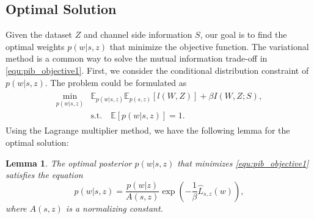 \documentclass[lettersize,journal]{IEEEtran}
\newcommand{\E}{\mathbb{E}}
\theoremstyle{definition}
\theoremstyle{plain}
\newtheorem{lemma}{Lemma}
\begin{document}
\subsection{Optimal Solution}
Given the dataset $Z$ and channel side information $S$, our goal is to find the optimal weights $p(w|s,z)$ that minimize the objective function. The variational method is a common way to solve the mutual information trade-off in \cref{equ:pib_objective1}. First, we consider the conditional distribution constraint of $p(w|s,z)$. The problem could be formulated as
\begin{align}
    \begin{split}
        \min_{p(w|s,z)} & \E_{p(w|s,z)} \E_{p(s,z)}\left[l(W,Z)\right] + \beta I(W,Z;S),\\
        & \text{s.t.}\quad \E \left[p(w|s,z)\right] =1.
    \end{split}
\end{align}
Using the Lagrange multiplier method, we have the following lemma for the optimal solution:
\begin{lemma}
\label{thm:optimal_solution}
The optimal posterior $p(w|s,z)$ that minimizes \cref{equ:pib_objective1} satisfies the equation
\begin{equation}
    \label{equ:optimal_solution}
    p(w|s,z) = \frac{p(w|z)}{A(s,z)}\exp\left(-\frac{1}{\beta}\hat{L}_{s,z}(w)\right),
\end{equation}
where $A(s,z)$ is a normalizing constant.
\end{lemma}
\end{document}
